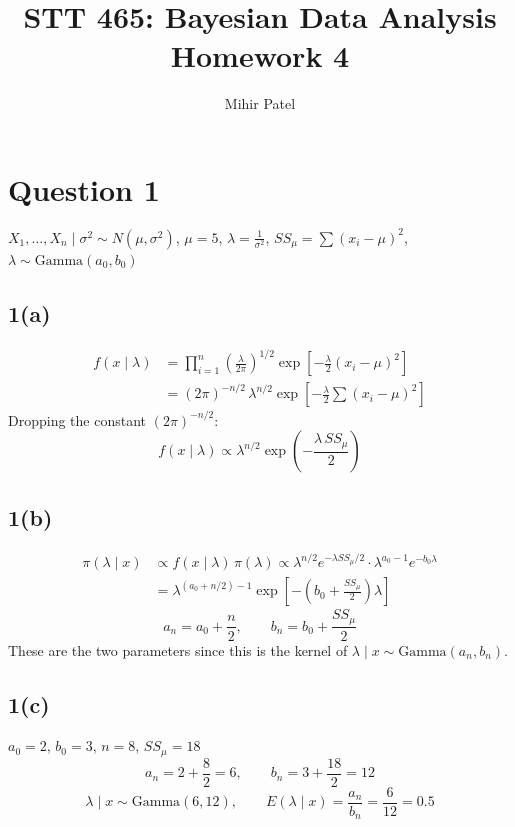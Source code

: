 \documentclass[11pt]{article}
\title{STT 465: Bayesian Data Analysis\\Homework 4}
\author{Mihir Patel}
\date{}
\begin{document}
\maketitle

\section*{Question 1}

$X_1,\dots,X_n \mid \sigma^2 \sim N(\mu,\sigma^2)$, \quad $\mu = 5$, \quad $\lambda = \frac{1}{\sigma^2}$, \quad $SS_\mu = \sum (x_i-\mu)^2$, \quad $\lambda \sim \text{Gamma}(a_0,b_0)$

\subsection*{1(a)}
\begin{align*}
f(x\mid\lambda) &= \prod_{i=1}^{n} \left(\frac{\lambda}{2\pi}\right)^{1/2} \exp\left[-\frac{\lambda}{2}(x_i-\mu)^2\right] \\
&= (2\pi)^{-n/2}\,\lambda^{n/2} \exp\left[-\frac{\lambda}{2}\sum (x_i-\mu)^2\right]
\end{align*}
Dropping the constant $(2\pi)^{-n/2}$:
\[
\boxed{f(x\mid\lambda) \propto \lambda^{n/2}\exp\left(-\frac{\lambda\, SS_\mu}{2}\right)}
\]

\subsection*{1(b)}
\begin{align*}
\pi(\lambda\mid x) &\propto f(x\mid\lambda)\,\pi(\lambda) \propto \lambda^{n/2} e^{-\lambda SS_\mu/2}\cdot \lambda^{a_0-1}e^{-b_0\lambda} \\
&= \lambda^{(a_0+n/2)-1}\exp\left[-\left(b_0+\frac{SS_\mu}{2}\right)\lambda\right]
\end{align*}
\[
\boxed{a_n = a_0 + \frac{n}{2}, \qquad b_n = b_0 + \frac{SS_\mu}{2}}
\]
These are the two parameters since this is the kernel of $\lambda\mid x \sim \text{Gamma}(a_n,b_n)$.

\subsection*{1(c)}
$a_0 = 2$, $b_0 = 3$, $n = 8$, $SS_\mu = 18$
\[
a_n = 2 + \frac{8}{2} = 6, \qquad b_n = 3 + \frac{18}{2} = 12
\]
\[
\lambda\mid x \sim \text{Gamma}(6,12), \qquad E(\lambda\mid x) = \frac{a_n}{b_n} = \frac{6}{12} = 0.5
\]
\end{document}
